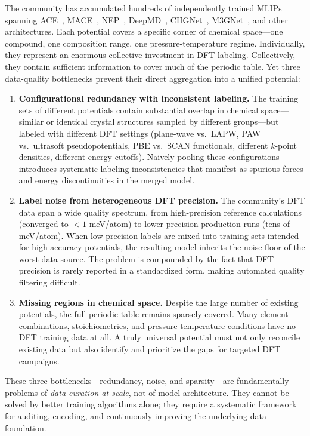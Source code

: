 \documentclass[twoside,prb,aps,floatfix,superscriptaddress,longbibliography]{revtex4-2}
\begin{document}
The community has accumulated hundreds of independently trained MLIPs spanning ACE~\cite{Drautz2019ACE,Lysogorskiy2021PACE}, MACE~\cite{Batatia2022MACE}, NEP~\cite{Fan2022NEP}, DeepMD~\cite{Wang2018DeepMD}, CHGNet~\cite{Deng2023CHGNet}, M3GNet~\cite{Chen2022M3GNet}, and other architectures. Each potential covers a specific corner of chemical space---one compound, one composition range, one pressure-temperature regime. Individually, they represent an enormous collective investment in DFT labeling. Collectively, they contain sufficient information to cover much of the periodic table. Yet three data-quality bottlenecks prevent their direct aggregation into a unified potential:

\begin{enumerate}[label=\textbf{(B\arabic*)}]
    \item \textbf{Configurational redundancy with inconsistent labeling.} The training sets of different potentials contain substantial overlap in chemical space---similar or identical crystal structures sampled by different groups---but labeled with different DFT settings (plane-wave vs.\ LAPW, PAW vs.\ ultrasoft pseudopotentials, PBE vs.\ SCAN functionals, different $k$-point densities, different energy cutoffs). Naively pooling these configurations introduces systematic labeling inconsistencies that manifest as spurious forces and energy discontinuities in the merged model.
    \item \textbf{Label noise from heterogeneous DFT precision.} The community's DFT data span a wide quality spectrum, from high-precision reference calculations (converged to $<1$ meV/atom) to lower-precision production runs (tens of meV/atom). When low-precision labels are mixed into training sets intended for high-accuracy potentials, the resulting model inherits the noise floor of the worst data source. The problem is compounded by the fact that DFT precision is rarely reported in a standardized form, making automated quality filtering difficult.
    \item \textbf{Missing regions in chemical space.} Despite the large number of existing potentials, the full periodic table remains sparsely covered. Many element combinations, stoichiometries, and pressure-temperature conditions have no DFT training data at all. A truly universal potential must not only reconcile existing data but also identify and prioritize the gaps for targeted DFT campaigns.
\end{enumerate}

These three bottlenecks---redundancy, noise, and sparsity---are fundamentally problems of \emph{data curation at scale}, not of model architecture. They cannot be solved by better training algorithms alone; they require a systematic framework for auditing, encoding, and continuously improving the underlying data foundation.
\end{document}
